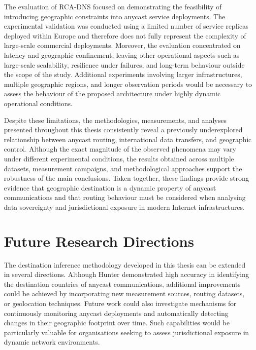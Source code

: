 The evaluation of RCA-DNS focused on demonstrating the feasibility of introducing geographic constraints into anycast service deployments. The experimental validation was conducted using a limited number of service replicas deployed within Europe and therefore does not fully represent the complexity of large-scale commercial deployments. Moreover, the evaluation concentrated on latency and geographic confinement, leaving other operational aspects such as large-scale scalability, resilience under failures, and long-term behaviour outside the scope of the study. Additional experiments involving larger infrastructures, multiple geographic regions, and longer observation periods would be necessary to assess the behaviour of the proposed architecture under highly dynamic operational conditions.

Despite these limitations, the methodologies, measurements, and analyses presented throughout this thesis consistently reveal a previously underexplored relationship between anycast routing, international data transfers, and geographic control. Although the exact magnitude of the observed phenomena may vary under different experimental conditions, the results obtained across multiple datasets, measurement campaigns, and methodological approaches support the robustness of the main conclusions. Taken together, these findings provide strong evidence that geographic destination is a dynamic property of anycast communications and that routing behaviour must be considered when analysing data sovereignty and jurisdictional exposure in modern Internet infrastructures.

\section{Future Research Directions}
\label{sc:conclusion_future}

The destination inference methodology developed in this thesis can be extended in several directions. Although Hunter demonstrated high accuracy in identifying the destination countries of anycast communications, additional improvements could be achieved by incorporating new measurement sources, routing datasets, or geolocation techniques. Future work could also investigate mechanisms for continuously monitoring anycast deployments and automatically detecting changes in their geographic footprint over time. Such capabilities would be particularly valuable for organisations seeking to assess jurisdictional exposure in dynamic network environments.

